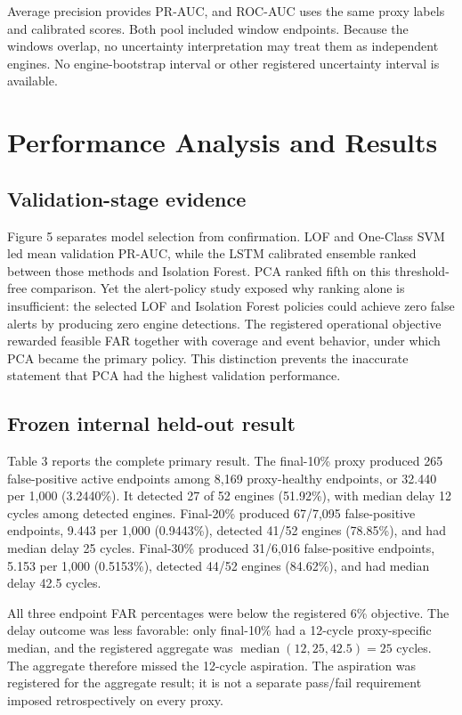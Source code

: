 \documentclass[11pt]{article}
\begin{document}
Average precision provides PR-AUC, and ROC-AUC uses the same proxy labels and calibrated scores. Both pool included window endpoints. Because the windows overlap, no uncertainty interpretation may treat them as independent engines. No engine-bootstrap interval or other registered uncertainty interval is available.


\section{Performance Analysis and Results}


\subsection{Validation-stage evidence}


Figure 5 separates model selection from confirmation. LOF and One-Class SVM led mean validation PR-AUC, while the LSTM calibrated ensemble ranked between those methods and Isolation Forest. PCA ranked fifth on this threshold-free comparison. Yet the alert-policy study exposed why ranking alone is insufficient: the selected LOF and Isolation Forest policies could achieve zero false alerts by producing zero engine detections. The registered operational objective rewarded feasible FAR together with coverage and event behavior, under which PCA became the primary policy. This distinction prevents the inaccurate statement that PCA had the highest validation performance.


\subsection{Frozen internal held-out result}


Table 3 reports the complete primary result. The final-10\% proxy produced 265 false-positive active endpoints among 8,169 proxy-healthy endpoints, or 32.440 per 1,000 (3.2440\%). It detected 27 of 52 engines (51.92\%), with median delay 12 cycles among detected engines. Final-20\% produced 67/7,095 false-positive endpoints, 9.443 per 1,000 (0.9443\%), detected 41/52 engines (78.85\%), and had median delay 25 cycles. Final-30\% produced 31/6,016 false-positive endpoints, 5.153 per 1,000 (0.5153\%), detected 44/52 engines (84.62\%), and had median delay 42.5 cycles.





All three endpoint FAR percentages were below the registered 6\% objective. The delay outcome was less favorable: only final-10\% had a 12-cycle proxy-specific median, and the registered aggregate was $\operatorname{median}(12,25,42.5)=25$ cycles. The aggregate therefore missed the 12-cycle aspiration. The aspiration was registered for the aggregate result; it is not a separate pass/fail requirement imposed retrospectively on every proxy.
\end{document}
